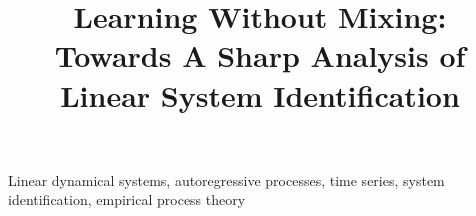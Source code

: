 \documentclass[final,12pt]{colt2018} %
\title[Learning Without Mixing]{Learning Without Mixing:\\ Towards A Sharp Analysis of Linear System Identification}
\begin{document}
 
\maketitle



\begin{keywords}
Linear dynamical systems, autoregressive processes, time series, system identification, empirical process theory
\end{keywords}
   




    




%   

\newpage
  
\newpage   
\appendix
\newpage 





%




     
\end{document}
